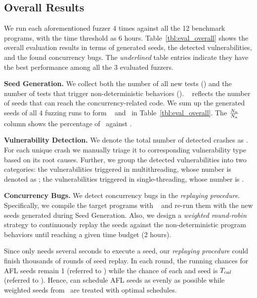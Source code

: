\subsection{Overall Results}\label{sec:eval_overall}

We run each aforementioned fuzzer 4 times against all the 12 benchmark programs, with the 
time threshold as 6 hours. Table~\ref{tbl:eval_overall} shows the overall evaluation results 
in terms of generated seeds, the detected vulnerabilities, and the found concurrency bugs. 
The \emph{underlined} table entries indicate they have the best performance among all the 3 
evaluated fuzzers. 

\textbf{Seed Generation.} 
We collect both the number of all new tests (\testsALL) and the number of tests that trigger 
non-deterministic behaviors (\testsMT). \testsMT~ reflects the number of seeds that can reach 
the concurrency-related code. We sum up the generated seeds of all 4 fuzzing runs to form 
\testsALL~ and \testsMT~in Table~\ref{tbl:eval_overall}. The $\frac{N_n}{N_a}$ column 
shows the percentage of \testsMT~against \testsALL.
    
\textbf{Vulnerability Detection.} 
We denote the total number of detected crashes as \vulsNUM. For each unique crash we manually 
triage it to corresponding vulnerability type based on its root causes. Further, we group 
the detected vulnerabilities into two categories: the vulnerabilities triggered in multithreading, whose number is denoted as \vulsMT; the vulnerabilities triggered in single-threading, whose number is \vulsST.




\textbf{Concurrency Bugs.} 
We detect concurrency bugs in the \emph{replaying procedure}. Specifically, we compile the target programs 
with \ts~\cite{lwn_tsan} and re-run them with the new seeds generated during {Seed Generation}. 			 
Also, we design a \emph{weighted round-robin} strategy to continuously replay the seeds against 
the non-deterministic program behaviors until reaching a given time budget (2 hours). 

Since \ts only needs several seconds to execute a seed, our \emph{replaying procedure} could 
finish thousands of rounds of seed replay. In each round, the running chances for AFL seeds remain 
1 (referred to ) while the chance of each \mtfuzz and \mtfuzzc seed is $T_{cal}$ 
(referred to ). Hence, \ts can schedule AFL seeds as evenly as possible while weighted 
seeds from \mtfuzz~are treated with optimal schedules. 

